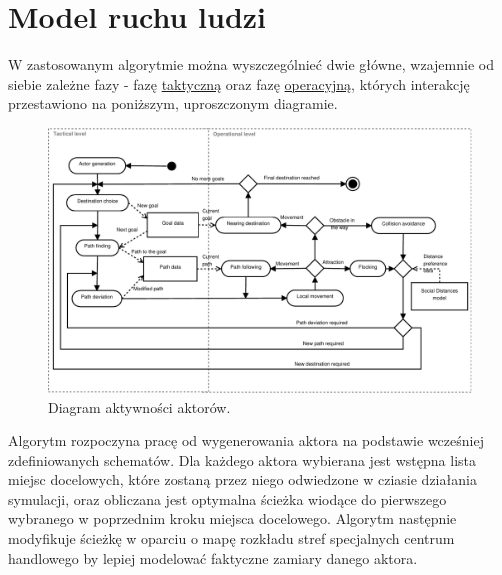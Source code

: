 \documentclass[a4paper, 12pt]{article}
\begin{document}

\newpage
    \section{Model ruchu ludzi}
    \label{sec:model}

    \noindent
    W zastosowanym algorytmie można wyszczególnieć dwie główne, wzajemnie od siebie zależne fazy - fazę \hyperref[sec:tactical]{taktyczną} oraz fazę \hyperref[sec:operational]{operacyjną}, których interakcję przestawiono na poniższym, uproszczonym diagramie.

    \begin{figure}[h!]
        \centering
        \includegraphics[scale=0.7]{./img/ActorActivity.pdf}
        \caption{Diagram aktywności aktorów.}
        \label{fig:actor-activity}
    \end{figure}


    Algorytm rozpoczyna pracę od wygenerowania aktora na podstawie wcześniej zdefiniowanych schematów.
Dla każdego aktora wybierana jest wstępna lista miejsc docelowych, które zostaną przez niego odwiedzone w cziasie działania symulacji, oraz obliczana jest optymalna ścieżka wiodące do pierwszego wybranego w poprzednim kroku miejsca docelowego. Algorytm następnie modyfikuje ścieżkę w oparciu o mapę rozkładu stref specjalnych centrum handlowego by lepiej modelować faktyczne zamiary danego aktora.
\end{document}
